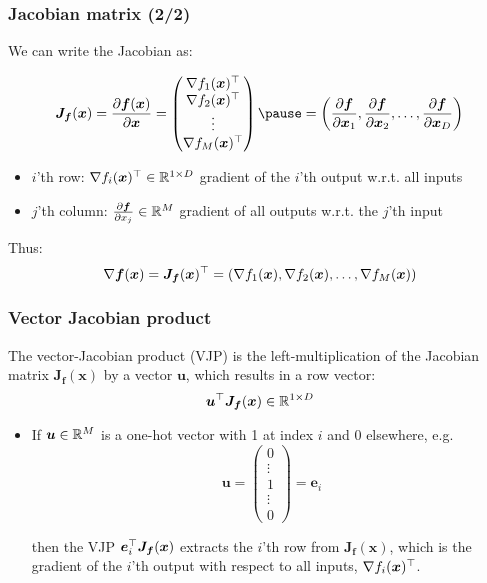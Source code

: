 \documentclass[smaller, handout]{beamer}
\begin{document}
\begin{frame}
  \frametitle{Jacobian matrix (2/2)}\pause

  We can write the Jacobian as:\pause

  \begin{equation}
    \bm J_{\bm f}(\bm x) = \pd{\bm f(\bm x)}{\bm x} =
    \begin{pmatrix}
    \nabla f_1(\bm x)\tr \\
    \nabla f_2(\bm x)\tr \\
    \vdots \\
    \nabla f_M(\bm x)\tr 
    \end{pmatrix} \pause = \lt( \pd{\bm f}{\bm x_1}, \pd{\bm f}{\bm x_2}, \ldots, \pd{\bm f}{\bm x_D} \rt)
  \end{equation}
\pause

\begin{itemize}
  \item $i$'th row: $\nabla f_i(\bm x)^{\top} \in \mathbb{R}^{1\times D}$ gradient of the $i$'th output w.r.t. all inputs
  \item $j$'th column: $\frac{\partial{\bm f}}{\partial{x_j}} \in\mathbb{R}^{M}$ gradient of all outputs w.r.t. the $j$'th input
\end{itemize}
  
\pause

Thus:
\begin{equation}
  \nabla \bm f(\bm x) = \bm J_{\bm f}(\bm x)^{\top} = \left( \nabla f_1(\bm x), \nabla f_2(\bm x), \ldots, \nabla f_M(\bm x) \right)
\end{equation}
\end{frame}

\begin{frame}
  \frametitle{Vector Jacobian product}\pause

  The vector-Jacobian product (VJP) is the left-multiplication of the Jacobian matrix $\bm J_{\bm f}(\bm x)$ by a vector $\bm u$, which results in a row vector:\pause
  \begin{equation}
    \bm u ^{\top} \bm J_{\bm f}(\bm x) \in \mathbb{R}^{1\times D}
  \end{equation}

  \pause

  \begin{itemize}
    \item If $\bm u\in \mathbb{R}^{M}$ is a one-hot vector with 1 at index $i$ and 0 elsewhere, e.g.
      \begin{equation}
        \bm u = 
        \begin{pmatrix}
          0 \\ \vdots \\ 1 \\ \vdots \\ 0
        \end{pmatrix} = \bm e_i
      \end{equation}

        then the VJP $\bm e_i^{\top} \bm J_{\bm f}(\bm x)$ extracts the $i$'th row from $\bm J_{\bm f}(\bm x)$, which is the gradient of the $i$'th output with respect to all inputs, $\nabla f_i(\bm x)^{\top}$.

  \end{itemize}
\end{frame}
\end{document}
